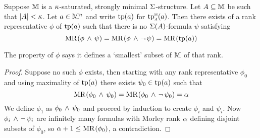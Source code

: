 \begin{lem}
    Suppose $\mathbb{M}$ is a $\kappa$-saturated, strongly minimal $\Sigma$-structure.
    Let $A \subseteq \mathbb{M}$ be such that $\left\vert A \right\vert < \kappa$.
    Let $a \in \mathbb{M}^n$ and write $\operatorname{tp}(a)$ for $\subintp{A}{\M}{\tp}(a)$.
    Then there exists of a rank representative $\phi$ of $\operatorname{tp}(a)$ such that 
    there is no $\Sigma(A)$-formula $\psi$ satisfying 
    \[\mathrm{MR}^{}(\phi \, \land \, \psi) = \mathrm{MR}^{}(\phi \, \land \, \neg\, \psi) = \mathrm{MR}^{}(\operatorname{tp}(a))\]

    The property of $\phi$ says it defines a `smallest' subset of $\mathbb{M}$ of 
    that rank.
\end{lem}
\begin{proof}
    Suppose no such $\phi$ exists, then starting with any rank representative 
    $\phi_0$ and using maximality of $\operatorname{tp}(a)$
    there exists $\psi_0 \in \operatorname{tp}(a)$ such that 
    \[\mathrm{MR}^{}(\phi_0 \, \land \, \psi_0) = \mathrm{MR}^{}(\phi_0 \, \land \, \neg\, \psi_0) = \alpha\]
    We define $\phi_1$ as $\phi_0 \, \land \, \psi_0$ and proceed by induction 
    to create $\phi_i$ and $\psi_i$.
    Now $\phi_i \, \land \, \neg\, \psi_i$ are infinitely 
    many formulas with Morley rank $\alpha$ defining disjoint subsets of $\phi_0$,
    so $\alpha + 1 \leq \mathrm{MR}^{}(\phi_0)$, a contradiction.
\end{proof}

